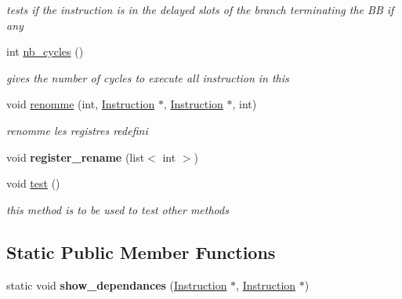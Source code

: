 \begin{DoxyCompactItemize}
\begin{DoxyCompactList}\small\item\em tests if the instruction is in the delayed slots of the branch terminating the \-B\-B if any \end{DoxyCompactList}\item 
\hypertarget{classBasic__block_a0a9caa9a904adc7807e390308e7b939c}{int \hyperlink{classBasic__block_a0a9caa9a904adc7807e390308e7b939c}{nb\-\_\-cycles} ()}\label{classBasic__block_a0a9caa9a904adc7807e390308e7b939c}

\begin{DoxyCompactList}\small\item\em gives the number of cycles to execute all instruction in this \end{DoxyCompactList}\item 
\hypertarget{classBasic__block_a97b6297693678a527caa6af6d1a7756c}{void \hyperlink{classBasic__block_a97b6297693678a527caa6af6d1a7756c}{renomme} (int, \hyperlink{classInstruction}{\-Instruction} $\ast$, \hyperlink{classInstruction}{\-Instruction} $\ast$, int)}\label{classBasic__block_a97b6297693678a527caa6af6d1a7756c}

\begin{DoxyCompactList}\small\item\em renomme les registres redefini \end{DoxyCompactList}\item 
\hypertarget{classBasic__block_a7d3641d184ea5252b583d653f77a7eda}{void {\bfseries register\-\_\-rename} (list$<$ int $>$)}\label{classBasic__block_a7d3641d184ea5252b583d653f77a7eda}

\item 
\hypertarget{classBasic__block_a0f26ff105216c62082905097b5dcebd3}{void \hyperlink{classBasic__block_a0f26ff105216c62082905097b5dcebd3}{test} ()}\label{classBasic__block_a0f26ff105216c62082905097b5dcebd3}

\begin{DoxyCompactList}\small\item\em this method is to be used to test other methods \end{DoxyCompactList}\end{DoxyCompactItemize}
\subsection*{\-Static \-Public \-Member \-Functions}
\begin{DoxyCompactItemize}
\item 
\hypertarget{classBasic__block_aef985f2438261d429f81c7b5d4de5f16}{static void {\bfseries show\-\_\-dependances} (\hyperlink{classInstruction}{\-Instruction} $\ast$, \hyperlink{classInstruction}{\-Instruction} $\ast$)}\label{classBasic__block_aef985f2438261d429f81c7b5d4de5f16}

\end{DoxyCompactItemize}


